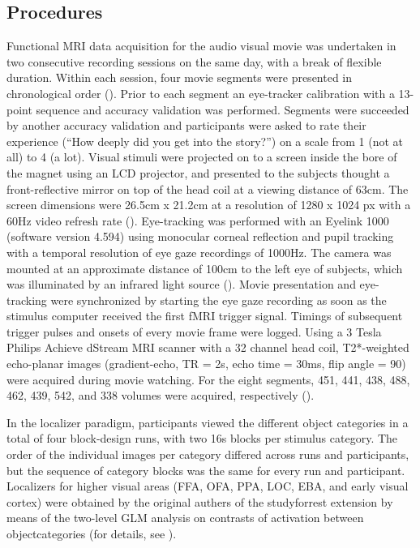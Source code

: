 \documentclass[a4paper, 12pt]{scrreprt}
\begin{document}
\subsection{Procedures}
Functional MRI data acquisition for the audio visual movie was undertaken in two consecutive recording sessions on the same day, with a break of flexible duration. Within each session, four movie segments were presented in chronological order (\cite{hanke2016studyforrest}).  Prior to each segment an eye-tracker calibration with a 13-point sequence and accuracy validation was performed.
Segments were succeeded by another accuracy validation and participants were asked to rate their experience (“How deeply did you get into the story?”) on a scale from 1 (not at all) to 4 (a lot). Visual stimuli were projected on to a screen inside the bore of the magnet using an LCD projector, and presented to the subjects thought a front-reflective mirror on top of the head
coil at a viewing distance of 63cm. The screen dimensions were 26.5cm x 21.2cm at a resolution of 1280 x 1024 px with a 60Hz video refresh rate (\cite{sengupta2016studyforrest}). Eye-tracking was performed with an Eyelink 1000 (software version 4.594) using monocular corneal reflection and pupil tracking with a temporal resolution of eye gaze recordings of 1000Hz. The camera was mounted at an approximate distance of 100cm to the left eye of subjects, which was illuminated
by an infrared light source (\cite{hanke2016studyforrest}). Movie presentation and eye-tracking were synchronized by starting the eye gaze recording as soon as the stimulus computer received the first fMRI trigger signal. Timings of subsequent trigger pulses and onsets of every movie frame
were logged. Using a 3 Tesla Philips Achieve dStream MRI scanner with a 32 channel head coil, T2*-weighted echo-planar images (gradient-echo, TR = 2s, echo time = 30ms, flip angle = 90) were acquired during movie watching. For the eight segments, 451, 441, 438, 488, 462, 439, 542, and 338 volumes were acquired, respectively (\cite{hanke2016studyforrest}).\newline

In the localizer paradigm, participants viewed the different object categories in a total of four block-design runs, with two 16s blocks per stimulus category. The order of the individual images per category differed across runs and participants, but the sequence of category blocks was the same for every run and participant. Localizers for higher visual areas (FFA, OFA, PPA, LOC, EBA, and early visual cortex) were obtained by the original authers of the studyforrest extension by means of the two-level GLM analysis on contrasts of activation between objectcategories (for details, see \cite{sengupta2016studyforrest}).
\end{document}
